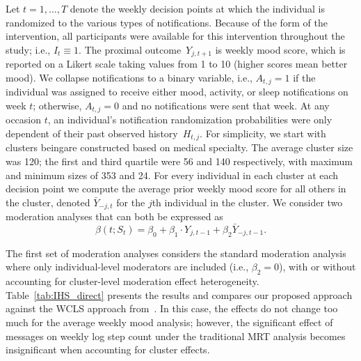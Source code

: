 \documentclass[12pt]{article}
\newcommand{\zw}[1]{\textcolor{blue}{[\textit{ZW: #1}]}}
\begin{document}
Let $t=1,\ldots,T$ denote the weekly decision points at which the individual is randomized to the various types of notifications.  Because of the form of the intervention, all participants were available for this intervention throughout the study; i.e., $I_t \equiv 1$. The proximal outcome~$Y_{j,t+1}$ is weekly mood score, which is reported on a Likert scale  taking values from 1 to 10 (higher scores mean better mood). We collapse notifications to a binary variable, i.e., $A_{t,j}=1$ if the individual was assigned to receive either mood, activity, or sleep notifications on week $t$; otherwise, $A_{t,j}= 0$ and no notifications were sent that week. At any occasion $t$, an individual's notification randomization probabilities were only dependent of their past observed history~$H_{t,j}$. For simplicity, we start with clusters beingare constructed based on medical specialty.  The average cluster size was 120; the first and third quartile were 56 and 140 respectively, with maximum and minimum sizes of 353 and 24.  For every individual in each cluster at each decision point we compute the average prior weekly mood score for all others in the cluster, denoted $\bar Y_{-j, t}$ for the $j$th individual in the cluster.  We consider two moderation analyses that can both be expressed as
$$
\beta(t; S_t) = \beta_0 + \beta_1 \cdot Y_{j,t-1} + \beta_2 \bar Y_{-j, t-1}.
$$

The first set of moderation analyses considers the standard moderation analysis where only individual-level moderators are included (i.e., $\beta_2 = 0$), with or without accounting for cluster-level moderation effect heterogeneity. Table~\ref{tab:IHS_direct} presents the results and compares our proposed approach against the WCLS approach from~\cite{Boruvkaetal}.  In this case, the effects do not change too much for the average weekly mood analysis; however, the significant effect of messages on weekly log step count under the traditional MRT analysis becomes insignificant when accounting for cluster effects.
\end{document}

